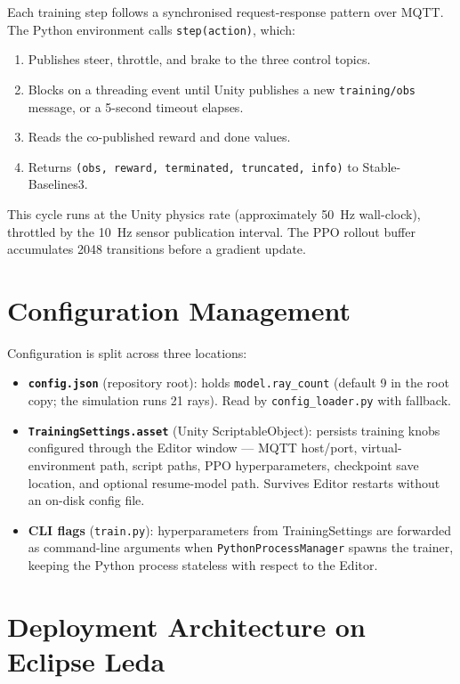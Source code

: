 Each training step follows a synchronised request-response pattern over
MQTT. The Python environment calls \texttt{step(action)}, which:
\begin{enumerate}[leftmargin=2cm,topsep=1.15pt,itemsep=1.15pt,partopsep=1.15pt,parsep=1.15pt]
  \item Publishes steer, throttle, and brake to the three control topics.
  \item Blocks on a threading event until Unity publishes a new
    \texttt{training/obs} message, or a 5-second timeout elapses.
  \item Reads the co-published reward and done values.
  \item Returns \texttt{(obs, reward, terminated, truncated, info)} to
    Stable-Baselines3.
\end{enumerate}
This cycle runs at the Unity physics rate (approximately 50~Hz
wall-clock), throttled by the 10~Hz sensor publication interval. The PPO
rollout buffer accumulates 2048 transitions before a gradient update.

\section{Configuration Management}
\label{sec:config}

Configuration is split across three locations:
\begin{itemize}[topsep=1.15pt,itemsep=1.15pt]
  \item \textbf{\texttt{config.json}} (repository root): holds
    \texttt{model.ray\_count} (default 9 in the root copy; the simulation
    runs 21 rays). Read by \texttt{config\_loader.py} with fallback.
  \item \textbf{\texttt{TrainingSettings.asset}} (Unity ScriptableObject):
    persists training knobs configured through the Editor window --- MQTT
    host/port, virtual-environment path, script paths, PPO
    hyperparameters, checkpoint save location, and optional resume-model
    path. Survives Editor restarts without an on-disk config file.
  \item \textbf{CLI flags} (\texttt{train.py}): hyperparameters from
    TrainingSettings are forwarded as command-line arguments when
    \texttt{PythonProcessManager} spawns the trainer, keeping the Python
    process stateless with respect to the Editor.
\end{itemize}

\section{Deployment Architecture on Eclipse Leda}
\label{sec:leda-arch}

